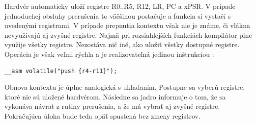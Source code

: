 Hardvér automaticky uloží registre R0..R5, R12, LR, PC a xPSR. V prípade jednoduchej obsluhy prerušenia to väčšinou postačuje a funkcia si vystačí s uvedenými registrami. V prípade prepnutia kontextu však nie je známe, či vlákna nevyužívajú aj zvyšné registre. Najmä pri rozsiahlejších funkciách kompilátor plne využije všetky registre. Nezostáva nič iné, ako uložiť všetky dostupné registre. Operácia je však veľmi rýchla a je realizovateľná jedinou inštrukciou :
{\small
\begin{verbatim}
__asm volatile("push {r4-r11}");
\end{verbatim}
}

Obnova kontextu je úplne analogická s ukladaním. Postupne sa vyberú registre, ktoré nie sú uložené hardvérom. Následne sa jadro informuje o tom, že sa vykonáva návrat z rutiny prerušenia, a že má vybrať aj zvyšné registre. Pokračujúca úloha bude teda opäť spustená bez zmeny registrov.
